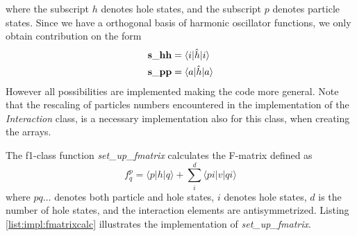 where the subscript $h$ denotes hole states, and the subscript $p$ denotes particle states. Since we have a orthogonal basis of harmonic oscillator functions, we only obtain contribution on the form
\begin{align}  
{\bf s\_{hh}}&=\langle i|\hat{h}|i\rangle\nonumber\\
{\bf s\_{pp}}&=\langle a|\hat{h}|a\rangle\nonumber
\end{align}
However all possibilities are implemented making the code more general. Note that the rescaling of particles numbers encountered in the implementation of the \emph{Interaction} class, is a necessary implementation also for this class, when creating the arrays.  

The f1-class function \emph{set\_up\_fmatrix} calculates the F-matrix defined as
\begin{equation}
 f_{q}^{p}= \langle p|h|q\rangle+\sum_i^d\langle pi|v|qi\rangle
\label{eq:impl:fockmatrix}
\end{equation} 
where $pq\ldots$ denotes both particle and hole states, $i$ denotes hole states, $d$ is the number of hole states, and the interaction elements are antisymmetrized. Listing \ref{list:impl:fmatrixcalc} illustrates the implementation of \emph{set\_up\_fmatrix}.
%
